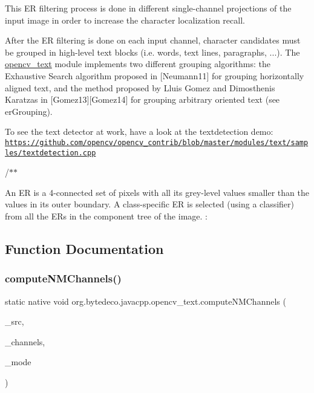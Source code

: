 This ER filtering process is done in different single-\/channel projections of the input image in order to increase the character localization recall. 

After the ER filtering is done on each input channel, character candidates must be grouped in high-\/level text blocks (i.\+e. words, text lines, paragraphs, ...). The \hyperlink{classorg_1_1bytedeco_1_1javacpp_1_1opencv__text}{opencv\+\_\+text} module implements two different grouping algorithms\+: the Exhaustive Search algorithm proposed in \mbox{[}Neumann11\mbox{]} for grouping horizontally aligned text, and the method proposed by Lluis Gomez and Dimosthenis Karatzas in \mbox{[}Gomez13\mbox{]}\mbox{[}Gomez14\mbox{]} for grouping arbitrary oriented text (see er\+Grouping). 

To see the text detector at work, have a look at the textdetection demo\+: \href{https://github.com/opencv/opencv_contrib/blob/master/modules/text/samples/textdetection.cpp}{\tt https\+://github.\+com/opencv/opencv\+\_\+contrib/blob/master/modules/text/samples/textdetection.\+cpp} 

/$\ast$$\ast$

An ER is a 4-\/connected set of pixels with all its grey-\/level values smaller than the values in its outer boundary. A class-\/specific ER is selected (using a classifier) from all the ER\textquotesingle{}s in the component tree of the image. \+: 

\subsection{Function Documentation}
\mbox{\label{group__text__detect_ga67163615b824817020e39c2738a0b122}} 
\subsubsection{\texorpdfstring{compute\+N\+M\+Channels()}{computeNMChannels()}}
{\footnotesize\ttfamily static native void org.\+bytedeco.\+javacpp.\+opencv\+\_\+text.\+compute\+N\+M\+Channels (\begin{DoxyParamCaption}\item[{@By\+Val Mat}]{\+\_\+src,  }\item[{@By\+Val Mat\+Vector}]{\+\_\+channels,  }\item[{int}]{\+\_\+mode }\end{DoxyParamCaption})\hspace{0.3cm}{\ttfamily [static]}}




